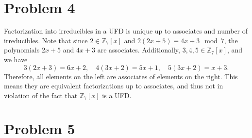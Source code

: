 \documentclass[11pt, letterpaper]{article}
\begin{document}
\section*{Problem 4}
Factorization into irreducibles in a UFD is unique up to associates and number of irreducibles. Note that since $2\in\mathbb{Z}_7[x]$ and $2(2x+5)\equiv 4x+3\mod{7}$, the polynomials $2x+5$ and $4x+3$ are associates. Additionally, $3,4,5\in\mathbb{Z}_7[x]$, and we have
\[
	3(2x+3)=6x+2,\quad 4(3x+2)=5x+1,\quad 5(3x+2)=x+3
.\]
Therefore, all elements on the left are associates of elements on the right. This means they are equivalent factorizations up to associates, and thus not in violation of the fact that $\mathbb{Z} _7[x]$ is a UFD.
\section*{Problem 5}
\end{document}
